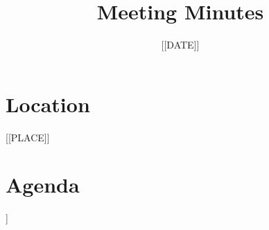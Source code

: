 \documentclass{article}
\title{Meeting Minutes}
\date{[[DATE]]}
\begin{document}
\maketitle

\section*{Location}
[[PLACE]]

\section*{Agenda}
\begin{itemize}
    [[CONTENT]]
\end{itemize}
\end{document}
